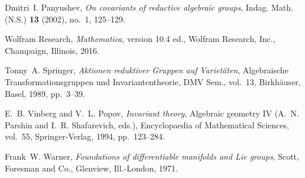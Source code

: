 \documentclass{amsart}
\theoremstyle{definition}
\theoremstyle{remark}
\begin{document}
\begin{thebibliography}{GSW12}
Dmitri~I. Panyushev, \emph{On covariants of reductive algebraic groups}, Indag.
Math. (N.S.) \textbf{13} (2002), no.~1, 125--129.

Wolfram Research, \emph{Mathematica}, version 10.4 ed., Wolfram Research, Inc.,
  Champaign, Illinois, 2016.

Tonny~A. Springer, \emph{Aktionen reduktiver {G}ruppen auf {V}ariet{\"a}ten},
Algebraische {T}ransformationsgruppen und {I}nvariantentheorie, DMV Sem.,
vol.~13, Birkh{\"a}user, Basel, 1989, pp.~3--39.

E.~B. Vinberg and V.~L. Popov, \emph{Invariant theory}, Algebraic geometry IV
  (A.~N. Parshin and I.~R. Shafarevich, eds.), Encyclopaedia of Mathematical
  Sciences, vol.~55, Springer-Verlag, 1994, pp.~123--284.

Frank~W. Warner, \emph{Foundations of differentiable manifolds and {L}ie
  groups}, Scott, Foresman and Co., Glenview, Ill.-London, 1971.

\end{thebibliography}
\end{document}
